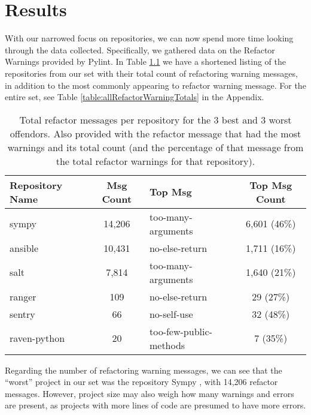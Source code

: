 \chapter{Results} \label{chapterResults}


With our narrowed focus on repositories, we can now spend more time looking through the data collected. Specifically, we gathered data on the Refactor Warnings provided by Pylint. In Table \ref{table:smallRefactorWarningTotals} we have a shortened listing of the repositories from our set with their total count of refactoring warning messages, in addition to the most commonly appearing to refactor warning message. For the entire set, see Table \ref{table:allRefactorWarningTotals} in the Appendix.

\begin{table}[ht]
  \small
  \centering
  \begin{tabularx}{0.8\textwidth} {
    | l 
    | c
    | >{\centering\arraybackslash}X 
    | c |
  }
    \hline
    Repository Name & Msg Count & Top Msg & Top Msg Count \\
    \hline\hline
    sympy & 14,206 & too-many-arguments & 6,601 (46\%) \\ \hline
    ansible &  10,431 & no-else-return & 1,711 (16\%) \\ \hline
    salt &  7,814 & too-many-arguments & 1,640 (21\%) \\ \hline \hline
    ranger & 109 & no-else-return & 29 (27\%) \\ \hline
    sentry & 66 & no-self-use & 32 (48\%) \\ \hline
    raven-python & 20 & too-few-public-methods & 7 (35\%) \\ \hline
  \end{tabularx}
  \caption{Total refactor messages per repository for the 3 best and 3 worst offendors. Also provided with the refactor message that had the most warnings and its total count (and the percentage of that message from the total refactor warnings for that repository).}
  \label{table:smallRefactorWarningTotals}
\end{table}

Regarding the number of refactoring warning messages, we can see that the ``worst'' project in our set was the repository Sympy \cite{data:sympy}, with 14,206 refactor messages. However, project size may also weigh how many warnings and errors are present, as projects with more lines of code are presumed to have more errors.

